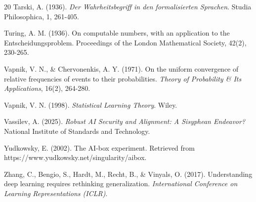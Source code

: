 \documentclass[11pt,twoside,letterpaper]{article}
\begin{document}
\begin{thebibliography}{20}
Tarski, A. (1936). \textit{Der Wahrheitsbegriff in den formalisierten Sprachen}. Studia Philosophica, 1, 261-405.

Turing, A. M. (1936). On computable numbers, with an application to the Entscheidungsproblem. Proceedings of the London Mathematical Society, 42(2), 230-265.

Vapnik, V. N., \& Chervonenkis, A. Y. (1971). On the uniform convergence of relative frequencies of events to their probabilities. \textit{Theory of Probability \& Its Applications}, 16(2), 264-280.

Vapnik, V. N. (1998). \textit{Statistical Learning Theory}. Wiley.

Vassilev, A. (2025). \textit{Robust AI Security and Alignment: A Sisyphean Endeavor?} National Institute of Standards and Technology.

Yudkowsky, E. (2002). The AI-box experiment. Retrieved from https://www.yudkowsky.net/singularity/aibox.

Zhang, C., Bengio, S., Hardt, M., Recht, B., \& Vinyals, O. (2017). Understanding deep learning requires rethinking generalization. \textit{International Conference on Learning Representations (ICLR)}.

\end{thebibliography}
\end{document}
